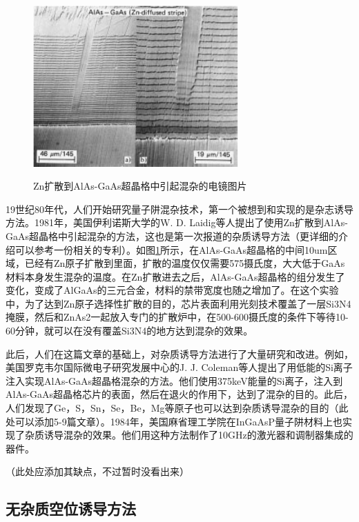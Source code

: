 \documentclass[oneside]{ZJUthesis}
\begin{document}
\begin{figure}[!h]
  \centering
  \includegraphics[width=0.7\textwidth]{./Pictures/iid.eps}\\
  \caption{Zn扩散到AlAs-GaAs超晶格中引起混杂的电镜图片}
  \label{fig_iid}
\end{figure}

19世纪80年代，人们开始研究量子阱混杂技术，第一个被想到和实现的是杂志诱导方法。1981年，美国伊利诺斯大学的W. D. Laidig等人提出了使用Zn扩散到AlAs-GaAs超晶格中引起混杂的方法\cite{laidig1981disorder}，这也是第一次报道的杂质诱导方法（更详细的介绍可以参考一份相关的专利\cite{holonyak1983method}）。如图\ref{fig_iid}所示，在AlAs-GaAs超晶格的中间10um区域，已经有Zn原子扩散到里面，扩散的温度仅仅需要575摄氏度，大大低于GaAs材料本身发生混杂的温度。在Zn扩散进去之后，AlAs-GaAs超晶格的组分发生了变化，变成了AlGaAs的三元合金，材料的禁带宽度也随之增加了。在这个实验中，为了达到Zn原子选择性扩散的目的，芯片表面利用光刻技术覆盖了一层Si3N4掩膜，然后和ZnAs2一起放入专门的扩散炉中，在500-600摄氏度的条件下等待10-60分钟，就可以在没有覆盖Si3N4的地方达到混杂的效果。

此后，人们在这篇文章的基础上，对杂质诱导方法进行了大量研究和改进。例如，美国罗克韦尔国际微电子研究发展中心的J. J. Coleman等人提出了用低能的Si离子注入实现AlAs-GaAs超晶格混杂的方法\cite{coleman1982disorder}。他们使用375keV能量的Si离子，注入到AlAs-GaAs超晶格芯片的表面，然后在退火的作用下，达到了混杂的目的。此后，人们发现了Ge，S，Sn，Se，Be，Mg等原子也可以达到杂质诱导混杂的目的（此处可以添加5-9篇文章）。1984年，美国麻省理工学院在InGaAsP量子阱材料上也实现了杂质诱导混杂的效果。他们用这种方法制作了10GHz的激光器和调制器集成的器件\cite{tsang1981intracavity}。

（此处应添加其缺点，不过暂时没看出来）

\subsection{无杂质空位诱导方法}
\end{document}
